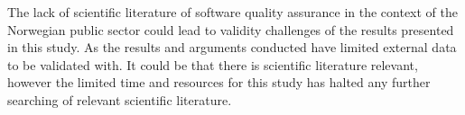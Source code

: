 The lack of scientific literature of software quality assurance in the context of the Norwegian public sector could lead to validity challenges of the results presented in this study. As the results and arguments conducted have limited external data to be validated with. It could be that there is scientific literature relevant, however the limited time and resources for this study has halted any further searching of relevant scientific literature.



